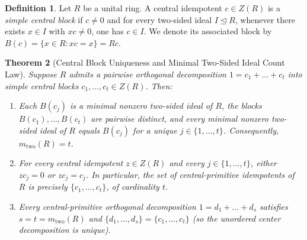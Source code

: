 \documentclass[11pt]{article}
\newtheorem{theorem}{Theorem}[section]
\theoremstyle{definition}
\newtheorem{definition}[theorem]{Definition}
\begin{document}
\begin{definition}
Let $R$ be a unital ring. A central idempotent $c \in Z(R)$ is a \emph{simple
central block} if $c \neq 0$ and for every two-sided ideal $I \trianglelefteq R$,
whenever there exists $x \in I$ with $xc \neq 0$, one has $c \in I$. We denote
its associated block by $B(c) = \{x \in R : xc = x\} = Rc$.
\end{definition}

\begin{theorem}[Central Block Uniqueness and Minimal Two-Sided Ideal Count Law]
\label{thm:central-block}
Suppose $R$ admits a pairwise orthogonal decomposition $1 = c_1 + \dots + c_t$
into simple central blocks $c_1, \dots, c_t \in Z(R)$. Then:
\begin{enumerate}
\item[(a)] Each $B(c_j)$ is a minimal nonzero two-sided ideal of $R$, the blocks
$B(c_1), \dots, B(c_t)$ are pairwise distinct, and every minimal nonzero
two-sided ideal of $R$ equals $B(c_j)$ for a unique $j \in \{1,\dots,t\}$.
Consequently, $m_{\mathrm{two}}(R) = t$.
\item[(b)] For every central idempotent $z \in Z(R)$ and every $j \in \{1,\dots,t\}$,
either $zc_j = 0$ or $zc_j = c_j$. In particular, the set of central-primitive
idempotents of $R$ is precisely $\{c_1, \dots, c_t\}$, of cardinality $t$.
\item[(c)] Every central-primitive orthogonal decomposition $1 = d_1 + \dots + d_s$
satisfies $s = t = m_{\mathrm{two}}(R)$ and $\{d_1, \dots, d_s\} =
\{c_1, \dots, c_t\}$ (so the unordered center decomposition is unique).
\end{enumerate}
\end{theorem}
\end{document}
